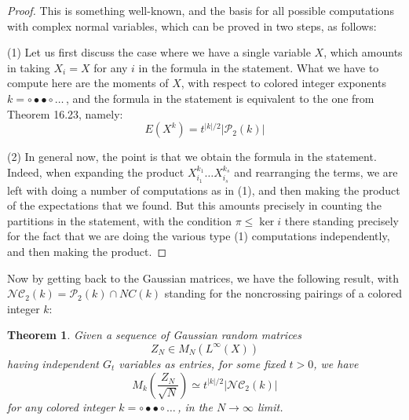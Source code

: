 \documentclass[12pt]{amsbook}
\newtheorem{theorem}{Theorem}[chapter]
\begin{document}
\begin{proof}
This is something well-known, and the basis for all possible computations with complex normal variables, which can be proved in two steps, as follows:

\medskip

(1) Let us first discuss the case where we have a single variable $X$, which amounts in taking $X_i=X$ for any $i$ in the formula in the statement. What we have to compute here are the moments of $X$, with respect to colored integer exponents $k=\circ\bullet\bullet\circ\ldots\,$, and the formula in the statement is equivalent to the one from Theorem 16.23, namely:
$$E(X^k)=t^{|k|/2}|\mathcal P_2(k)|$$

(2) In general now, the point is that we obtain the formula in the statement. Indeed, when expanding the product $X_{i_1}^{k_1}\ldots X_{i_s}^{k_s}$ and rearranging the terms, we are left with doing a number of computations as in (1), and then making the product of the expectations that we found. But this amounts precisely in counting the partitions in the statement, with the condition $\pi\leq\ker i$ there standing precisely for the fact that we are doing the various type (1) computations independently, and then making the product.
\end{proof}

Now by getting back to the Gaussian matrices, we have the following result, with $\mathcal{NC}_2(k)=\mathcal P_2(k)\cap NC(k)$ standing for the noncrossing pairings of a colored integer $k$:

\begin{theorem}
Given a sequence of Gaussian random matrices
$$Z_N\in M_N(L^\infty(X))$$
having independent $G_t$ variables as entries, for some fixed $t>0$, we have
$$M_k\left(\frac{Z_N}{\sqrt{N}}\right)\simeq t^{|k|/2}|\mathcal{NC}_2(k)|$$
for any colored integer $k=\circ\bullet\bullet\circ\ldots\,$, in the $N\to\infty$ limit.
\end{theorem}
\end{document}
